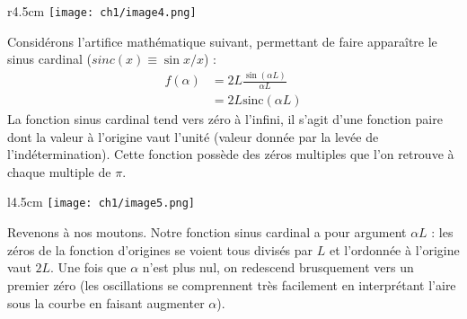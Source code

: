 \begin{wrapfigure}[8]{r}{4.5cm}
\vspace{-5mm}
\texttt{[image: ch1/image4.png]}
\end{wrapfigure}
Considérons l'artifice mathématique suivant, permettant de faire apparaître le 
sinus cardinal ($sinc(x) \equiv \sin x/x$) :
\begin{equation}
\begin{array}{ll}
f(\alpha) &= 2L \frac{\sin(\alpha L)}{\alpha L}\\
&= 2L\text{sinc}(\alpha L)
\end{array}
\end{equation}
La fonction sinus cardinal tend vers zéro à l'infini, il s'agit d'une fonction paire dont 
la valeur à l'origine vaut l'unité (valeur donnée par la levée de l'indétermination). Cette 
fonction possède des zéros multiples que l'on retrouve à chaque multiple de $\pi$.\newpage

\begin{wrapfigure}[8]{l}{4.5cm}
\texttt{[image: ch1/image5.png]}
\end{wrapfigure}
Revenons à nos moutons. Notre fonction sinus cardinal a pour argument $\alpha L$ : les zéros 
de la fonction d'origines se voient tous divisés par $L$ et l'ordonnée à l'origine vaut $2L$. 
Une fois que $\alpha$ n'est plus nul, on redescend brusquement vers un premier zéro (les 
oscillations se comprennent très facilement en interprétant l'aire sous la courbe en faisant 
augmenter $\alpha$).\\
\ \\

